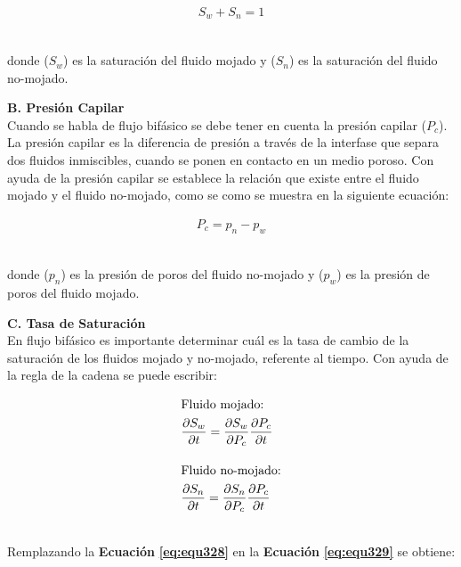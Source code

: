 \begin{ceqn} 
\begin{gather} \label{eq:equ27} 
S_w + S_n = 1
\end{gather}  
\end{ceqn}
\\
donde ($S_w$) es la saturación del fluido mojado y ($S_n$) es la saturación del fluido no-mojado.\bigskip\bigskip


\textbf{B. Presión Capilar}
\\
Cuando se habla de flujo bifásico se debe tener en cuenta la presión capilar ($P_c$). La presión capilar es la diferencia de presión a través de la interfase que separa dos fluidos inmiscibles, cuando se ponen en contacto en un medio poroso. Con ayuda de la presión capilar se establece la relación que existe entre el fluido mojado y el fluido no-mojado, como se como se muestra en la siguiente ecuación:\bigskip

\begin{ceqn} 
\begin{gather} \label{eq:equ328} 
P_c = p_n - p_w
\end{gather}  
\end{ceqn}
\\
donde ($p_n$) es la presión de poros del fluido no-mojado y ($p_w$) es la presión de poros del fluido mojado.\bigskip\bigskip


\textbf{C. Tasa de Saturación}
\\
En flujo bifásico es importante determinar cuál es la tasa de cambio de la saturación de los fluidos mojado y no-mojado, referente al tiempo. Con ayuda de la regla de la cadena se puede escribir:

\begin{ceqn} 
\begin{subequations} \label{eq:equ329} 
\begin{align}
\shortintertext{Fluido mojado:} &\frac{\partial S_w}{\partial t} = \frac{\partial S_w}{\partial P_c}\frac{\partial P_c}{\partial t} \label{eq:equ329a} \\[10pt]
\shortintertext{Fluido no-mojado:} 			&\frac{\partial S_n}{\partial t} = \frac{\partial S_n}{\partial P_c}\frac{\partial P_c}{\partial t} \label{eq:equ329b}
\end{align}
\end{subequations} 
\end{ceqn}
\\
Remplazando la \textbf{Ecuación} \textbf{\ref{eq:equ328}} en la \textbf{Ecuación} \textbf{\ref{eq:equ329}} se obtiene:

